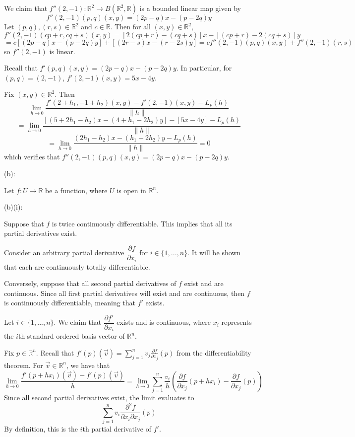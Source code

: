 \documentclass{article}
\theoremstyle{plain} %
\numberwithin{thm}{section} %
\theoremstyle{definition}
\begin{document}
\begin{question}{28}
        We claim that \(f''(2,-1) : \mathbb{R}^2 \to B(\mathbb{R}^2,\mathbb{R})\) is a bounded linear map given by
        \[
            f''(2,-1)(p,q)(x,y) = (2p - q)x - (p - 2q)y
        \]
        Let \((p,q), (r,s) \in \mathbb{R}^2\) and \(c \in \mathbb{R}\). Then for all \((x,y) \in \mathbb{R}^2\),
        \[
            f''(2,-1)(cp + r, cq + s)(x,y) = [2(cp + r) - (cq + s)]x - [(cp + r) - 2(cq + s)]y
        \]
        \[
            = c[(2p - q)x - (p - 2q)y] + [(2r - s)x - (r - 2s)y] = cf''(2,-1)(p,q)(x,y) + f''(2,-1)(r,s)
        \]
        so \(f''(2,-1)\) is linear.

        Recall that \(f'(p,q)(x,y) = (2p - q)x - (p - 2q)y\). In particular, for \((p,q) = (2,-1)\), \(f'(2,-1)(x,y) = 5x - 4y\).
        
        Fix \((x,y) \in \mathbb{R}^2\). Then
        \[
            \lim_{h \to 0} \frac{f'(2 + h_1, -1 + h_2)(x,y) - f'(2,-1)(x,y) - L_p(h)}{\|h\|}
        \]
        \[
            = \lim_{h \to 0} \frac{[(5 + 2h_1 - h_2)x - (4 + h_1 - 2h_2)y] - [5x - 4y] - L_p(h)}{\|h\|}
        \]
        \[
            = \lim_{h \to 0} \frac{(2h_1 - h_2)x - (h_1 - 2h_2)y - L_p(h)}{\|h\|} = 0
        \]
        which verifies that \(f''(2,-1)(p,q)(x,y) = (2p - q)x - (p - 2q)y\).

        (b):

        Let \(f : U \to \mathbb{R}\) be a function, where \(U\) is open in \(\mathbb{R}^n\).

        (b)(i):

        Suppose that \(f\) is twice continuously differentiable. This implies that all its partial derivatives exist.

        Consider an arbitrary partial derivative \(\dfrac{\partial f}{\partial x_i}\) for \(i \in \{1, ..., n\}\). It will be shown that each are continuously totally differentiable.


        
        Conversely, suppose that all second partial derivatives of \(f\) exist and are continuous. Since all first partial derivatives will exist and are continuous, then \(f\) is continuously differentiable, meaning that \(f'\) exists.

        Let \(i \in \{1, ..., n\}\). We claim that \(\dfrac{\partial f'}{\partial x_i}\) exists and is continuous, where \(x_i\) represents the \(i\)th standard ordered basis vector of \(\mathbb{R}^n\).

        Fix \(p \in \mathbb{R}^n\). Recall that \(f'(p)(\vec{v}) = \sum_{j=1} ^n v_j \frac{\partial f}{\partial x_j}(p)\) from the differentiability theorem. For \(\vec{v} \in \mathbb{R}^n\), we have that
        \[
            \lim_{h \to 0} \frac{f'(p + hx_i)(\vec{v}) - f'(p)(\vec{v})}{h} = \lim_{h \to 0} \sum_{j=1} ^n \frac{v_i}{h}\left( \frac{\partial f}{\partial x_j} (p + hx_i) - \frac{\partial f}{\partial x_j} (p) \right)
        \]
        Since all second partial derivatives exist, the limit evaluates to
        \[
            \sum_{j=1} ^n v_i \frac{\partial ^2 f}{\partial x_i \partial x_j} (p)
        \]
        By definition, this is the \(i\)th partial derivative of \(f'\).


\end{question}
\end{document}
